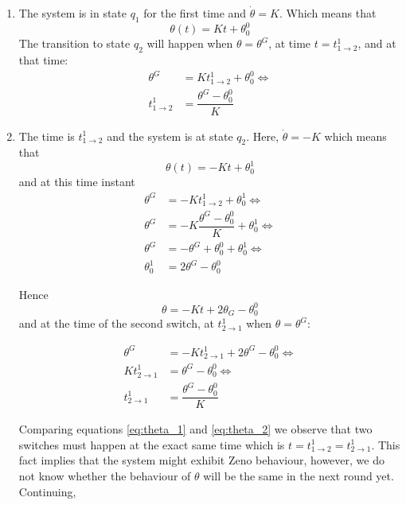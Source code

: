 \begin{enumerate}
    \item The system is in state $q_1$ for the first time and $\dot{\theta} = K$.
      Which means that
      $$\theta(t) = K t + \theta_0^0$$
      The transition to state $q_2$ will happen when $\theta =\theta^G$, at time
      $t = t_{1\rightarrow2}^1$, and at that time:
      \begin{align}
        \theta^G &= K t_{1\rightarrow2}^1 + \theta_0^0 \Leftrightarrow \nonumber \\
        t_{1\rightarrow2}^1 &= \dfrac{\theta^G - \theta_0^0}{K} \label{eq:theta_1}
      \end{align}

    \item The time is $t_{1\rightarrow2}^1$ and the system is at state $q_2$. Here,
      $\dot{\theta} = -K$ which means that
      $$\theta(t) = -K t + \theta_0^1$$
      and at this time instant
      \begin{align*}
        \theta^G &= -K t_{1\rightarrow2}^1 + \theta_0^1 \Leftrightarrow \\
        \theta^G &= -K \dfrac{\theta^G - \theta_0^0}{K} + \theta_0^1 \Leftrightarrow \\
        \theta^G &= -\theta^G + \theta_0^0 + \theta_0^1 \Leftrightarrow \\
        \theta_0^1 &= 2\theta^G - \theta_0^0
      \end{align*}


      Hence
      $$\theta = -K t + 2\theta_G - \theta_0^0$$
      and at the time of the second switch, at $t_{2\rightarrow1}^1$ when $\theta = \theta^G$:

      \begin{align}
        \theta^G &= -K t_{2\rightarrow1}^1 + 2\theta^G - \theta_0^0 \Leftrightarrow \nonumber \\
        K t_{2\rightarrow1}^1 &= \theta^G - \theta_0^0 \Leftrightarrow \nonumber \\
        t_{2\rightarrow1}^1 &= \dfrac{\theta^G - \theta_0^0}{K} \label{eq:theta_2}
      \end{align}

      Comparing equations \ref{eq:theta_1} and \ref{eq:theta_2} we observe that
      two switches must happen at the exact same time which is
      $t = t_{1\rightarrow2}^1 = t_{2\rightarrow1}^1$. This fact implies that
      the system might exhibit Zeno behaviour, however, we do not know whether
      the behaviour of $\theta$ will be the same in the next round yet.
      Continuing,


\end{enumerate}
